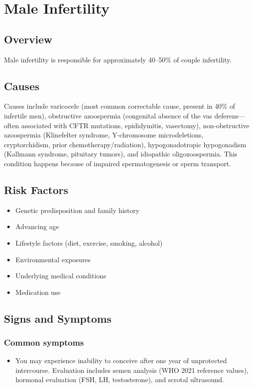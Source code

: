 \chapter{Male Infertility}
\label{sec:Male Infertility}

\section{Overview}
Male infertility is responsible for approximately 40--50\% of couple infertility.
\section{Causes}
Causes include varicocele (most common correctable cause, present in 40\% of infertile men), obstructive azoospermia (congenital absence of the vas deferens---often associated with CFTR mutations, epididymitis, vasectomy), non-obstructive azoospermia (Klinefelter syndrome, Y-chromosome microdeletions, cryptorchidism, prior chemotherapy/radiation), hypogonadotropic hypogonadism (Kallmann syndrome, pituitary tumors), and idiopathic oligozoospermia. This condition happens because of impaired spermatogenesis or sperm transport.     
\section{Risk Factors}

\begin{itemize}[noitemsep]
  \item Genetic predisposition and family history
  \item Advancing age
  \item Lifestyle factors (diet, exercise, smoking, alcohol)
  \item Environmental exposures
  \item Underlying medical conditions
  \item Medication use
\end{itemize}
\section{Signs and Symptoms}

\subsection{Common symptoms}
\begin{itemize}[noitemsep]
  \item You may experience inability to conceive after one year of unprotected intercourse. Evaluation includes semen analysis (WHO 2021 reference values), hormonal evaluation (FSH, LH, testosterone), and scrotal ultrasound. 
  \end{itemize}

